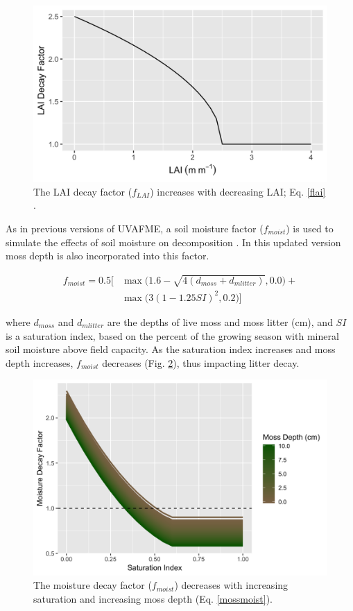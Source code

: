 \documentclass[a4paper, 12pt] {report}
\begin{document}
\begin{figure}
  \includegraphics[width=0.9\linewidth]{Figures/fLAI.png}
  \caption{The LAI decay factor ($f_{LAI}$) increases with decreasing LAI; Eq. \ref{flai} \protect\cite{bonanCarbonNitrogenCycling1990}.}
  \label{fig:fLAI}
\end{figure}

As in previous versions of UVAFME, a soil moisture factor ($f_{moist}$) is used to simulate the effects of soil moisture on decomposition \cite{fosterValidationApplicationForest2017}. In this updated version moss depth is also incorporated into this factor. 

\begin{equation} \label{mossmoist}
  \begin{aligned}
f_{moist} = 0.5\Bigg[ & \max\Big(1.6 - \sqrt{4(d_{moss} + d_{mlitter})}, 0.0\Big) + \\
  & \max\Big(3(1 - 1.25SI)^2, 0.2\Big)\Bigg]
 \end{aligned}
\end{equation}

where $d_{moss}$ and $d_{mlitter}$ are the depths of live moss and moss litter (cm), and $SI$ is a saturation index, based on the percent of the growing season with mineral soil moisture above field capacity. As the saturation index increases and moss depth increases, $f_{moist}$ decreases (Fig. \ref{fig:moistfig}), thus impacting litter decay.

\begin{figure}
  \includegraphics[width=0.9\linewidth]{Figures/MossMoistFact.png}
  \caption{The moisture decay factor ($f_{moist}$) decreases with increasing saturation and increasing moss depth (Eq. \ref{mossmoist}).}
  \label{fig:moistfig}
\end{figure}
\end{document}
